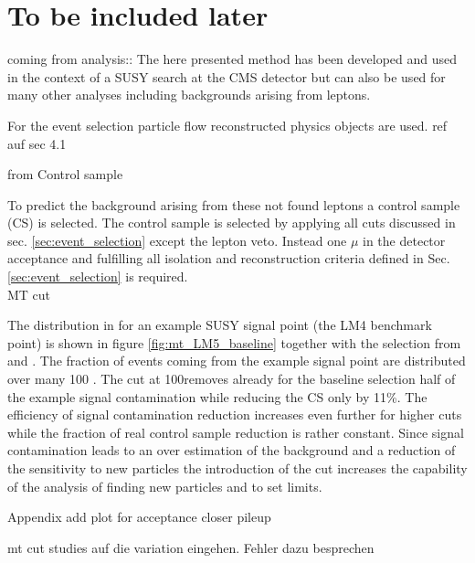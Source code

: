 \section{To be included later}

coming from analysis::
The here presented method has been developed and used in the context of a SUSY search at the CMS detector %
but can also be used for many other analyses including backgrounds arising from leptons.

For the event selection particle flow reconstructed physics objects are used.  ref auf sec 4.1


from Control sample

To predict the background arising from these not found leptons a control sample (CS) is selected. The control sample is selected by applying all cuts discussed in sec. \ref{sec:event_selection} except the lepton veto. Instead one $\mu$ in the detector acceptance and fulfilling all isolation and reconstruction criteria defined in Sec.\ref{sec:event_selection} is required.\\


MT cut

The distribution in \mt for an example SUSY signal point (the LM4 benchmark point) is shown in figure \ref{fig:mt_LM5_baseline} together with the selection from \ttbar and \wpj. The fraction of events coming from the example signal point are distributed over many 100 \gev. The cut at 100\gev removes already for the baseline selection half of the example signal contamination while reducing the CS only by 11\%.  The efficiency of signal contamination reduction increases even further for higher \MHT cuts while the fraction of real control sample reduction is rather constant.
Since signal contamination leads to an over estimation of the background and a reduction of the sensitivity to new particles the introduction of the \mt cut increases the capability of the analysis of finding new particles and to set limits.




Appendix add plot for acceptance closer pileup

mt cut studies auf die variation eingehen. Fehler dazu besprechen







